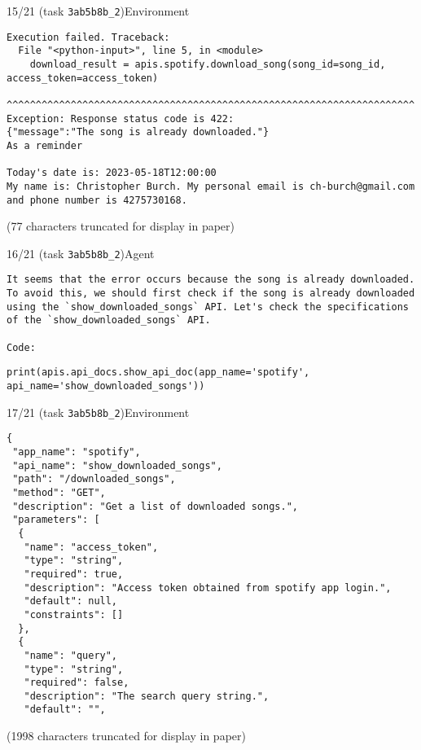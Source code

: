 \hspace*{8mm}%
\begin{minipage}{0.95\linewidth}
\begin{user_message_box}{{15/21 (task \texttt{3ab5b8b\_2})\hfill Environment}}
\scriptsize
\begin{Verbatim}[breaklines]
Execution failed. Traceback:
  File "<python-input>", line 5, in <module>
    download_result = apis.spotify.download_song(song_id=song_id, access_token=access_token)
                      ^^^^^^^^^^^^^^^^^^^^^^^^^^^^^^^^^^^^^^^^^^^^^^^^^^^^^^^^^^^^^^^^^^^^^^
Exception: Response status code is 422:
{"message":"The song is already downloaded."}
As a reminder

Today's date is: 2023-05-18T12:00:00
My name is: Christopher Burch. My personal email is ch-burch@gmail.com and phone number is 4275730168.
\end{Verbatim}
(77 characters truncated for display in paper)\end{user_message_box}
\end{minipage}

\begin{minipage}{0.95\linewidth}
\begin{assistant_message_box}{{16/21 (task \texttt{3ab5b8b\_2})\hfill Agent}}
\scriptsize
\begin{Verbatim}[breaklines]
It seems that the error occurs because the song is already downloaded. To avoid this, we should first check if the song is already downloaded using the `show_downloaded_songs` API. Let's check the specifications of the `show_downloaded_songs` API.

Code:
\end{Verbatim}
\begin{tcolorbox}[colback=codebgcolor,boxrule=0pt]\begin{Verbatim}[breaklines]
print(apis.api_docs.show_api_doc(app_name='spotify', api_name='show_downloaded_songs'))
\end{Verbatim}
\end{tcolorbox}\end{assistant_message_box}
\end{minipage}

\hspace*{8mm}%
\begin{minipage}{0.95\linewidth}
\begin{user_message_box}{{17/21 (task \texttt{3ab5b8b\_2})\hfill Environment}}
\scriptsize
\begin{Verbatim}[breaklines]
{
 "app_name": "spotify",
 "api_name": "show_downloaded_songs",
 "path": "/downloaded_songs",
 "method": "GET",
 "description": "Get a list of downloaded songs.",
 "parameters": [
  {
   "name": "access_token",
   "type": "string",
   "required": true,
   "description": "Access token obtained from spotify app login.",
   "default": null,
   "constraints": []
  },
  {
   "name": "query",
   "type": "string",
   "required": false,
   "description": "The search query string.",
   "default": "",
\end{Verbatim}
(1998 characters truncated for display in paper)\end{user_message_box}
\end{minipage}

